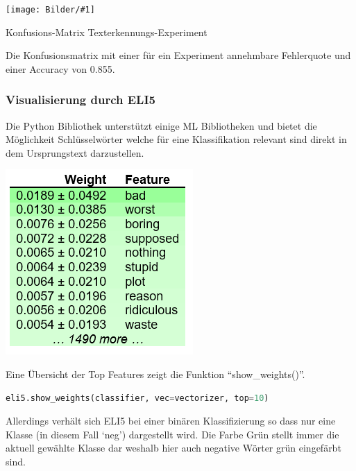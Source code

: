 \documentclass[
  12pt, %
  a4paper, %
  oneside, %
  openany, 
  numbers=noenddot, %
  BCOR=5mm, %
  parskip=half*, %
  thesis, %
]{bfhbook}
\newcommand{\imgText}[3]{
\begin{center}
    \begin{minipage}[t]{0.6\textwidth}
    		\vspace{0pt}
		\texttt{[image: Bilder/\#1]}
		\caption{#2}
	\end{minipage}\hfill
    \begin{minipage}[t]{0.4\textwidth}
    		\vspace{0pt}
  		#3
    \end{minipage}
\end{center}
}
\begin{document}
\imgText{MovieReviews-SentimentClassification_ConfMatrix.PNG}{Konfusions-Matrix Texterkennungs-Experiment}{
}
Die Konfusionsmatrix mit einer für ein Experiment annehmbare Fehlerquote und einer Accuracy von 0.855.

\subsubsection*{Visualisierung durch ELI5}
Die Python Bibliothek \cite{ELI5} unterstützt einige \gls{ML} Bibliotheken und bietet die Möglichkeit Schlüsselwörter welche für eine Klassifikation relevant sind direkt in dem Ursprungstext darzustellen. 

\begin{center}
\begin{minipage}[t]{0.45\linewidth}
\vspace{0pt}
\centering
	\includegraphics[width=\textwidth]{Bilder/MovieReviews-SentimentClassification_Weights.PNG}
\end{minipage}\hfill
\begin{minipage}[t]{0.45\linewidth}
\vspace{20pt}
Eine Übersicht der Top Features zeigt die Funktion ``show\_weights()''.
\begin{lstlisting}[language=Python]
eli5.show_weights(classifier, vec=vectorizer, top=10)
\end{lstlisting}
Allerdings verhält sich ELI5 bei einer binären Klassifizierung so dass nur eine Klasse (in diesem Fall `neg') dargestellt wird. Die Farbe Grün stellt immer die aktuell gewählte Klasse dar weshalb hier auch negative Wörter grün eingefärbt sind.
\end{minipage}
\end{center}
\end{document}
